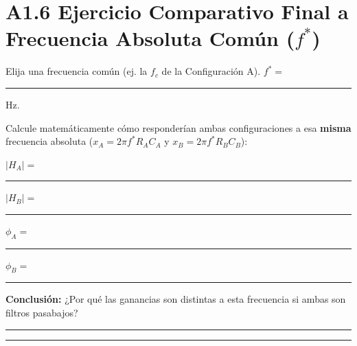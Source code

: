 \documentclass[11pt, a4paper]{article}
\begin{document}
\section*{A1.6 Ejercicio Comparativo Final a Frecuencia Absoluta Común ($f^*$)}
Elija una frecuencia común (ej. la $f_c$ de la Configuración A). $f^* = $ \rule{3cm}{0.4pt} Hz. \par
Calcule matemáticamente cómo responderían ambas configuraciones a esa \textbf{misma} frecuencia absoluta ($x_A = 2\pi f^* R_A C_A$ y $x_B = 2\pi f^* R_B C_B$): \par
$|H_A| = $ \rule{3cm}{0.4pt} \quad $|H_B| = $ \rule{3cm}{0.4pt} \par
$\phi_A = $ \rule{3cm}{0.4pt} \quad $\phi_B = $ \rule{3cm}{0.4pt} \par
\textbf{Conclusión:} ¿Por qué las ganancias son distintas a esta frecuencia si ambas son filtros pasabajos? \par
\noindent\rule{\textwidth}{0.4pt} \par\vspace{0.1cm}
\noindent\rule{\textwidth}{0.4pt}
\end{document}
